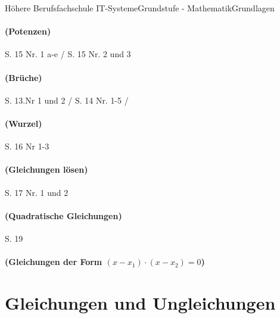 \documentclass[11pt,twocolumn,oneside,openany,headings=optiontotoc,11pt,numbers=noenddot]{article}
\begin{document}
\begin{worksheet}{Höhere Berufsfachschule IT-Systeme}{Grundstufe - Mathematik}{Grundlagen}
		\paragraph{(Potenzen)} S. 15 Nr. 1 a-e / S. 15 Nr. 2 und 3\\
		\paragraph{(Brüche)} S. 13.Nr 1 und 2 / S. 14 Nr. 1-5 /\\
		\paragraph{(Wurzel)} S. 16 Nr 1-3\\
		\paragraph{(Gleichungen lösen)} S. 17 Nr. 1 und 2
		\paragraph{(Quadratische Gleichungen)} S. 19
		\paragraph{(Gleichungen der Form \((x-x_1)\cdot(x-x_2) = 0 \))}
		\newpage
		\section{Gleichungen und Ungleichungen}

\end{worksheet}
\end{document}
